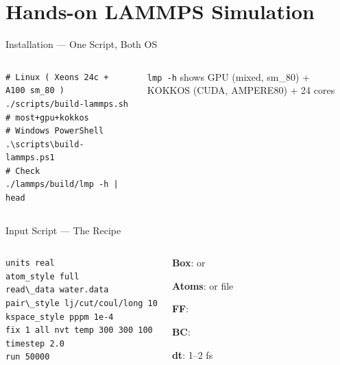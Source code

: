 \section{Hands-on LAMMPS Simulation}

\begin{frame}[fragile]{Installation --- One Script, Both OS}
  \begin{columns}[T,onlytextwidth]
    \begin{verbatim}
# Linux ( Xeons 24c + A100 sm_80 )
./scripts/build-lammps.sh   # most+gpu+kokkos
# Windows PowerShell
.\scripts\build-lammps.ps1
# Check
./lammps/build/lmp -h | head
    \end{verbatim}
    \begin{successbox}
      \footnotesize \texttt{lmp -h} shows GPU (mixed, sm\_80) + KOKKOS (CUDA, AMPERE80) + 24 cores
    \end{successbox}
  \end{columns}
\end{frame}

\begin{frame}[fragile]{Input Script --- The Recipe}
  \begin{columns}[T,onlytextwidth]
    \begin{verbatim}
units real
atom_style full
read\_data water.data
pair\_style lj/cut/coul/long 10
kspace_style pppm 1e-4
fix 1 all nvt temp 300 300 100
timestep 2.0
run 50000
    \end{verbatim}
    \begin{pitemize}
      \item \textbf{Box}:  or 
      \item \textbf{Atoms}:  or file
      \item \textbf{FF}: 
      \item \textbf{BC}: 
      \item \textbf{dt}: 1--2 fs
    \end{pitemize}
  \end{columns}
\end{frame}


